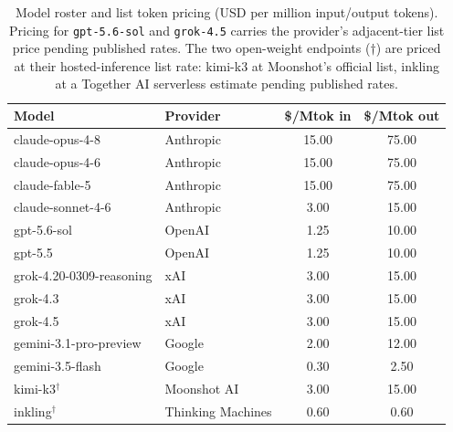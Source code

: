 \begin{table}[t]
  \centering
  \caption{Model roster and list token pricing (USD per million input/output
  tokens). Pricing for \texttt{gpt-5.6-sol} and \texttt{grok-4.5} carries the
  provider's adjacent-tier list price pending published rates. The two open-weight
  endpoints ($\dagger$) are priced at their hosted-inference list rate: kimi-k3 at
  Moonshot's official list, inkling at a Together AI serverless estimate pending
  published rates.}
  \label{tab:roster}
  \small
  \begin{tabular}{llcc}
    \toprule
    Model & Provider & \$/Mtok in & \$/Mtok out \\
    \midrule
    claude-opus-4-8            & Anthropic & 15.00 & 75.00 \\
    claude-opus-4-6            & Anthropic & 15.00 & 75.00 \\
    claude-fable-5             & Anthropic & 15.00 & 75.00 \\
    claude-sonnet-4-6          & Anthropic &  3.00 & 15.00 \\
    gpt-5.6-sol                & OpenAI    &  1.25 & 10.00 \\
    gpt-5.5                    & OpenAI    &  1.25 & 10.00 \\
    grok-4.20-0309-reasoning   & xAI       &  3.00 & 15.00 \\
    grok-4.3                   & xAI       &  3.00 & 15.00 \\
    grok-4.5                   & xAI       &  3.00 & 15.00 \\
    gemini-3.1-pro-preview     & Google    &  2.00 & 12.00 \\
    gemini-3.5-flash           & Google    &  0.30 &  2.50 \\
    kimi-k3$^\dagger$          & Moonshot AI        &  3.00 & 15.00 \\
    inkling$^\dagger$          & Thinking Machines  &  0.60 &  0.60 \\
    \bottomrule
  \end{tabular}
\end{table}

